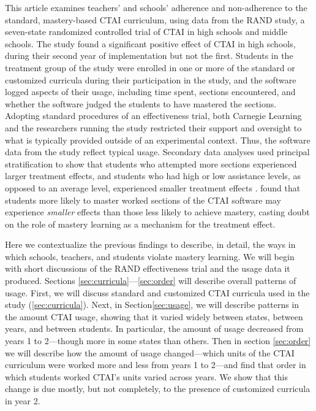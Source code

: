 \documentclass[12pt]{article}\usepackage[]{graphicx}\usepackage[]{color}
\begin{document}
This article examines teachers' and schools' adherence and
non-adherence to the standard, mastery-based CTAI curriculum, using
data from the RAND study, a seven-state randomized controlled trial of
CTAI in high schools and middle schools. The study found a significant
positive effect of CTAI in high schools, during their second year of
implementation but not the first. Students in the treatment group of
the study were enrolled in one or more of the standard or customized
curricula during their participation in the study, and the software
logged aspects of their usage, including time spent, sections
encountered, and whether the software judged the students to have
mastered the sections. Adopting standard procedures of an
effectiveness trial, both Carnegie Learning and the researchers
running the study restricted their support and oversight to what is
typically provided outside of an experimental context. Thus, the
software data from the study reflect typical usage. Secondary data analyses used principal stratification to show that students who attempted more sections experienced larger treatment effects, and students who had high or low assistance levels, as opposed to an average level, experienced smaller treatment effects \citep{sales2015exploring,sales2016student}.
\citet{sales2017role} found that students more likely to master worked
sections of the CTAI software may experience \emph{smaller} effects
than those less likely to achieve mastery, casting doubt on the role
of mastery learning as a mechanism for the treatment effect.

Here we contextualize the previous findings to describe, in detail, the ways
in which schools, teachers, and students violate mastery learning.
We will begin with short discussions of the RAND effectiveness trial and the usage
data it produced.
Sections \ref{sec:curricula}---\ref{sec:order} will describe overall
patterns of usage.
First, we will discuss standard and customized CTAI curricula used in the study (\ref{sec:curricula}).
Next, in Section\ref{sec:usage}, we will describe patterns in the amount CTAI usage, showing that
it varied widely between states, between years, and between students.
In particular, the amount of usage decreased from years 1 to
2---though more in some states than others.
Then in section \ref{sec:order} we will describe how the amount of usage
changed---which units of the CTAI curriculum were worked more and less
from years 1 to 2---and find that order in which students worked
CTAI's units varied across years. We show that this change is due
mostly, but not completely, to the presence of customized curricula in
year 2.
\end{document}
